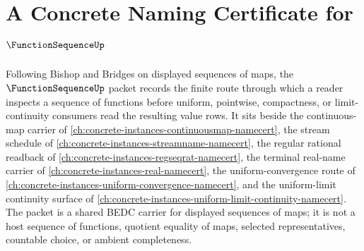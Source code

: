 \chapter{A Concrete Naming Certificate for $\FunctionSequenceUp$}
\label{ch:concrete-instances-function-sequence-namecert}

Following Bishop and Bridges on displayed sequences of maps, the $\FunctionSequenceUp$ packet records the finite route through which a reader inspects a sequence of functions before uniform, pointwise, compactness, or limit-continuity consumers read the resulting value rows. It sits beside the continuous-map carrier of \autoref{ch:concrete-instances-continuousmap-namecert}, the stream schedule of \autoref{ch:concrete-instances-streamname-namecert}, the regular rational readback of \autoref{ch:concrete-instances-regseqrat-namecert}, the terminal real-name carrier of \autoref{ch:concrete-instances-real-namecert}, the uniform-convergence route of \autoref{ch:concrete-instances-uniform-convergence-namecert}, and the uniform-limit continuity surface of \autoref{ch:concrete-instances-uniform-limit-continuity-namecert}. The packet is a shared BEDC carrier for displayed sequences of maps; it is not a host sequence of functions, quotient equality of maps, selected representatives, countable choice, or ambient completeness.

